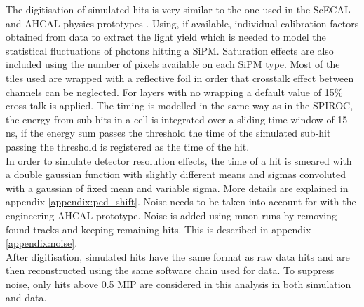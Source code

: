 The digitisation of simulated hits is very similar to the one used in the ScECAL and AHCAL physics prototypes \cite{2011_JINST_6_P04003}. Using, if available, individual calibration factors obtained from data to extract the light yield which is needed to model the statistical fluctuations of photons hitting a SiPM. Saturation effects are also included using the number of pixels available on each SiPM type. Most of the tiles used are wrapped with a reflective foil in order that crosstalk effect between channels can be neglected. For layers with no wrapping a default value of 15\% cross-talk is applied. The timing is modelled in the same way as in the SPIROC, the energy from sub-hits in a cell is integrated over a sliding time window of 15 ns, if the energy sum passes the threshold the time of the simulated sub-hit passing the threshold is registered as the time of the hit.\\

In order to simulate detector resolution effects, the time of a hit is smeared with a double gaussian function with slightly different means and sigmas convoluted with a gaussian of fixed mean and variable sigma. More details are explained in appendix \ref{appendix:ped_shift}. Noise needs to be taken into account for with the engineering AHCAL prototype. Noise is added using muon runs by removing found tracks and keeping remaining hits. This is described in appendix \ref{appendix:noise}.\\

After digitisation, simulated hits have the same format as raw data hits and are then reconstructed using the same software chain used for data. To suppress noise, only hits above 0.5 MIP are considered in this analysis in both simulation and data.
